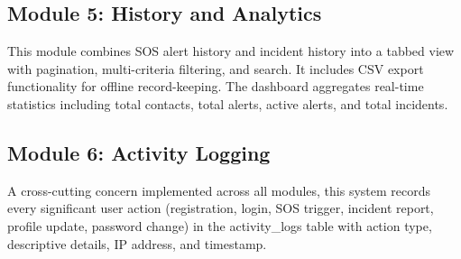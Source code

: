 \subsection{Module 5: History and Analytics}

This module combines SOS alert history and incident history into a tabbed view with pagination, multi-criteria filtering, and search. It includes CSV export functionality for offline record-keeping. The dashboard aggregates real-time statistics including total contacts, total alerts, active alerts, and total incidents.

\subsection{Module 6: Activity Logging}

A cross-cutting concern implemented across all modules, this system records every significant user action (registration, login, SOS trigger, incident report, profile update, password change) in the activity\_logs table with action type, descriptive details, IP address, and timestamp.
